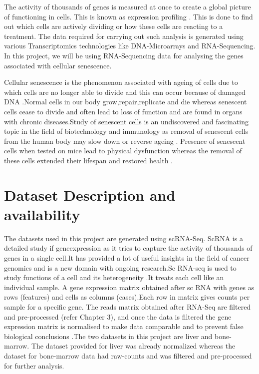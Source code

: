 \documentclass{sydneythesis}
\begin{document}
The activity of thousands of genes is measured at once to create a
global picture of functioning in cells. This is known as expression
profiling \autocite{metsis2004whole}. This is done to find out which
cells are actively dividing or how these cells are reacting to a
treatment. The data required for carrying out such analysis is generated
using various Transcriptomics
technologies\autocite{lowe2017transcriptomics} like DNA-Microarrays and
RNA-Sequencing. In this project, we will be using RNA-Sequencing data
for analysing the genes associated with cellular senescence.

Cellular senescence is the phenomenon associated with ageing of cells
due to which cells are no longer able to divide and this can occur
because of damaged DNA \autocite{hayflick1961serial}.Normal cells in our
body grow,repair,replicate and die whereas senescent cells cease to
divide and often lead to loss of function and are found in organs with
chronic diseases.Study of senescent cells is an undiscovered and
fascinating topic in the field of biotechnology and immunology as
removal of senescent cells from the human body may slow down or reverse
ageing \autocite{de2017fountain}. Presence of senescent cells when
tested on mice lead to physical dysfunction whereas the removal of these
cells extended their lifespan and restored health
\autocite{pan2017inhibition}.

\section{Dataset Description and
availability}\label{dataset-description-and-availability}

The datasets used in this project are generated using scRNA-Seq. ScRNA
is a detailed study if geneexpression as it tries to capture the
activity of thousands of genes in a single cell.It has provided a lot of
useful insights in the field of cancer
genomics\autocite{hwang2018single} and is a new domain with ongoing
research.Sc RNA-seq is used to study functions of a cell and its
heterogeneity \autocite{papalexi2018single}.It treats each cell like an
individual sample. A gene expression matrix obtained after sc RNA with
genes as rows (features) and cells as columns (cases).Each row in matrix
gives counts per sample for a specific gene. The reads matrix obtained
after RNA-Seq are filtered and pre-processed (refer Chapter 3), and once
the data is filtered the gene expression matrix is normalised to make
data comparable and to prevent false biological conclusions
\autocite{steinhoff2006normalization}.The two datasets in this project
are liver and bone-marrow. The dataset provided for liver was already
normalized whereas the dataset for bone-marrow data had raw-counts and
was filtered and pre-processed for further analysis.
\end{document}

